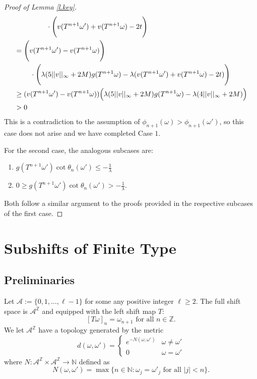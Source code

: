 \documentclass{amsart}
\newcommand{\NN}{\mathbb{N}}
\newcommand{\ZZ}{\mathbb{Z}}
\newcommand{\A}{\mathcal{A}}
\begin{document}
\begin{proof}[Proof of Lemma \ref{l.key}]
\begin{align*}
        &\hspace{16mm}\cdot \Bigg(v(T^{n+1}\omega') + v(T^{n+1}\omega) - 2t\Bigg)\\
        &= \Bigg(v(T^{n+1}\omega') - v(T^{n+1}\omega)\Bigg)\\
        &\hspace{8mm}\cdot\Bigg(\lambda(5||v||_\infty+2M) g(T^{n+1}\omega) - \lambda (v(T^{n+1}\omega') + v(T^{n+1}\omega) - 2t)\Bigg)\\
        &\geq ( v(T^{n+1}\omega') - v(T^{n+1}\omega) ) \Big(\lambda(5||v||_\infty+2M) g(T^{n+1}\omega) - \lambda (4||v||_\infty+2M) \Big)\\
        &>0
    \end{align*}
    This is a contradiction to the assumption of $\phi_{n+1}(\omega) > \phi_{n+1}(\omega')$, so this case does not arise and we have completed Case $1$.
    
    For the second case, the analogous subcases are:
    \begin{enumerate}
        \item $g(T^{n+1}\omega')\cot\theta_{n}(\omega')\leq -\frac{1}{\lambda}$
        \item $0\geq g(T^{n+1}\omega')\cot\theta_{n}(\omega')> -\frac{1}{\lambda}$.
    \end{enumerate}
    Both follow a similar argument to the proofs provided in the respective subcases of the first case.
\end{proof}

\section{Subshifts of Finite Type}\hypertarget{SFT}{}

\subsection{Preliminaries}\hypertarget{prelim}{} Let $\A := \{0,1, \dots, \ell-1\}$ for some any positive integer $\ell\geq 2$. The full shift space is $\A^{\ZZ}$ and equipped with the left shift map $T$:
\[[T\omega]_n = \omega_{n+1} \text{ for all } n\in \ZZ.\]
We let $\A^\ZZ$ have a topology generated by the metric
\[d(\omega,\omega') = \begin{cases}
    e^{-N(\omega,\omega')} & \omega \neq \omega'\\
    0 & \omega = \omega'
\end{cases}\]
where $N: \A^\ZZ \times \A^\ZZ \rightarrow \NN$ defined as
\begin{equation}\label{e.N}
    N(\omega,\omega') = \max\{n\in \NN: \omega_j = \omega'_j \text{ for all } |j| < n\}.
\end{equation}
\end{document}
